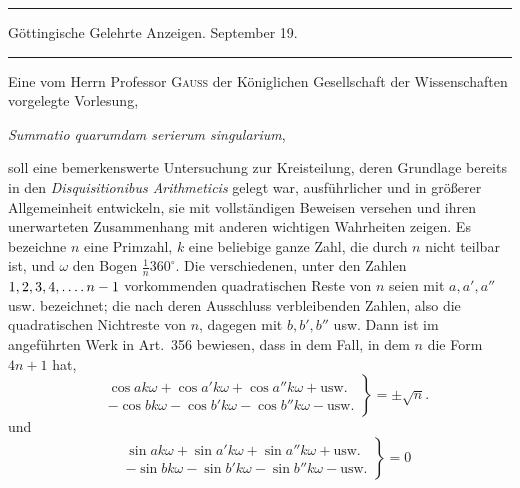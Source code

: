 \clearpage{}%
\begin{center}
\rule{.98\linewidth}{.3pt}\par
Göttingische Gelehrte Anzeigen. September 19.\par
\rule{.98\linewidth}{.3pt}
\end{center}

Eine vom Herrn Professor \textsc{Gauss} der Königlichen Gesellschaft der Wissenschaften vorgelegte Vorlesung,
\begin{center}\emph{Summatio quarumdam serierum singularium},\end{center}
soll eine bemerkenswerte Untersuchung zur Kreisteilung, deren Grundlage bereits in den \emph{Disquisitionibus Arithmeticis} gelegt war, ausführlicher und in größerer Allgemeinheit entwickeln, sie mit vollständigen Beweisen versehen und ihren unerwarteten Zusammenhang mit anderen wichtigen Wahrheiten zeigen. Es bezeichne $n$ eine Primzahl, $k$ eine beliebige ganze Zahl, die durch $n$ nicht teilbar ist, und $\omega$ den Bogen $\frac1n360^\circ$. Die verschiedenen, unter den Zahlen $1,2,3,4,\mathinner{.\,.\,.\,.} n-1$ vorkommenden quadratischen Reste von $n$ seien mit $a,a',a''$ usw. bezeichnet; die nach deren Ausschluss verbleibenden Zahlen, also die quadratischen Nichtreste von $n$, dagegen mit $b,b',b''$ usw. Dann ist im angeführten Werk in Art.~356 bewiesen, dass in dem Fall, in dem $n$ die Form $4n+1$ hat,
\[
\left.\begin{aligned}
&\cos ak\omega+\cos a'k\omega+\cos a''k\omega+\text{usw.}\\
&-\cos bk\omega-\cos b'k\omega-\cos b''k\omega-\text{usw.}
\end{aligned}\right\}=\pm\surd n.
\]
und
\[
\left.\begin{aligned}
&\sin ak\omega+\sin a'k\omega+\sin a''k\omega+\text{usw.}\\
&-\sin bk\omega-\sin b'k\omega-\sin b''k\omega-\text{usw.}
\end{aligned}\right\}=0
\]
%
